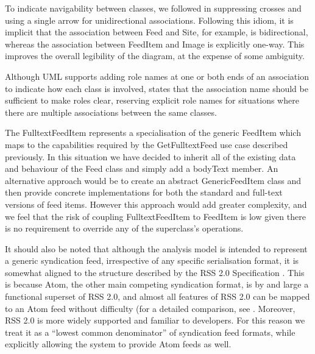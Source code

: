 \documentclass[runningheads,a4paper]{llncs}
\begin{document}
To indicate navigability between classes, we followed \cite{arlow} in suppressing crosses and using a single arrow for unidirectional associations. Following this idiom, it is implicit that the association between \textsf{Feed} and \textsf{Site}, for example, is bidirectional, whereas the association between \textsf{FeedItem} and \textsf{Image} is explicitly one-way. This improves the overall legibility of the diagram, at the expense of some ambiguity.

Although UML supports adding role names at one or both ends of an association to indicate how each class is involved, \cite{ambler} states that the association name should be sufficient to make roles clear, reserving explicit role names for situations where there are multiple associations between the same classes.

The \textsf{FulltextFeedItem} represents a specialisation of the generic \textsf{FeedItem} which maps to the capabilities required by the \textsf{GetFulltextFeed} use case described previously. In this situation we have decided to inherit all of the existing data and behaviour of the \textsf{Feed} class and simply add a \textsf{bodyText} member. An alternative approach would be to create an abstract \textsf{GenericFeedItem} class and then provide concrete implementations for both the standard and full-text versions of feed items. However this approach would add greater complexity, and we feel that the risk of coupling \textsf{FulltextFeedItem} to \textsf{FeedItem} is low given there is no requirement to override any of the superclass's operations.

It should also be noted that although the analysis model is intended to represent a generic syndication feed, irrespective of any specific serialisation format, it is somewhat aligned to the structure described by the RSS 2.0 Specification \cite{rss}. This is because Atom, the other main competing syndication format, is by and large a functional superset of RSS 2.0, and almost all features of RSS 2.0 can be mapped to an Atom feed without difficulty (for a detailed comparison, see \cite{atomrss}. Moreover, RSS 2.0 is more widely supported and familiar to developers. For this reason we treat it as a ``lowest common denominator'' of syndication feed formats, while explicitly allowing the system to provide Atom feeds as well.
\end{document}
